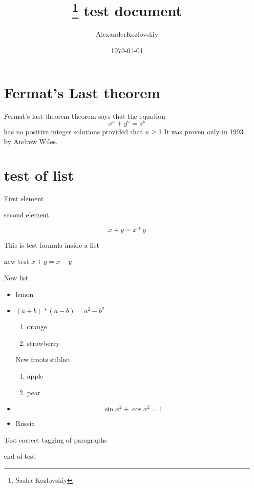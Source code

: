 \documentclass{article}
\title{\thanks{Sasha Kozlovskiy} test document}
\author{AlexanderKozlovskiy}
\date{\today}
\begin{document}
\maketitle{}
\section{Fermat's Last theorem}

Fermat's last theorem theorem says that the equation 
\[ 
x^n+y^n=z^n 
\] has no positive integer solutions provided that \( n\ge 3 \) It was proven only in 1993 by Andrew Wiles.
\section{test of list}
\begin{description}
\item First element
\item second element
\item \[x+y=x*y\]

This is test formula inside a list
\item new test
\(x+y=x-y\)
\end{description}
New list
\begin{itemize}
\item lemon
\item \((a+b)*(a-b)=a^2-b^2\)
\begin{enumerate}
\item orange
\item strawberry
\end{enumerate}
New froots sublist
\begin{enumerate}
\item apple
\item pear
\end{enumerate}
\item \[\sin{x}^2+\cos{x}^2=1\]
\item Russia
\end{itemize}

Test correct tagging of paragraphs

end of test
\end{document}
